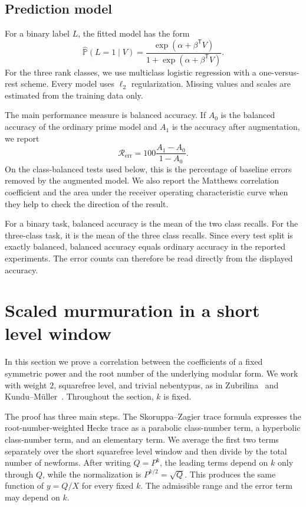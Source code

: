 \documentclass[12pt,reqno]{amsart}
\numberwithin{equation}{section}
\theoremstyle{plain}
\theoremstyle{definition}
\theoremstyle{remark}
\begin{document}
\subsection{Prediction model}

For a binary label $L$, the fitted model has the form
\begin{equation*}
\widehat{\mathbb P}(L=1\mid V)
=
\frac{\exp(\alpha+\beta^{\mathsf T}V)}
{1+\exp(\alpha+\beta^{\mathsf T}V)}.
\end{equation*}
For the three rank classes, we use multiclass logistic regression with a one-versus-rest scheme.  Every model uses $\ell_2$ regularization.
Missing values and scales are estimated from the training data only.

The main performance measure is balanced accuracy.  If $A_0$ is the balanced accuracy of the ordinary prime model and $A_1$ is the accuracy after augmentation, we report
\begin{equation}
\label{eqErrorReduction}
\mathcal R_{\mathrm{err}}
=
100\frac{A_1-A_0}{1-A_0}.
\end{equation}
On the class-balanced tests used below, this is the percentage of baseline errors removed by the augmented model.
We also report the Matthews correlation coefficient and the area under the receiver operating characteristic curve when they help to check the direction of the result.

For a binary task, balanced accuracy is the mean of the two class recalls.
For the three-class task, it is the mean of the three class recalls.
Since every test split is exactly balanced, balanced accuracy equals ordinary accuracy in the reported experiments.
The error counts can therefore be read directly from the displayed accuracy.

\section{Scaled murmuration in a short level window}
\label{sec:scaled-murmuration}

In this section we prove a correlation between the coefficients of a fixed symmetric power and the root number of the underlying modular form.
We work with weight $2$, squarefree level, and trivial nebentypus, as in Zubrilina~\cite{Zubrilina2025} and Kundu--M\"uller~\cite{KunduMuller2026}.
Throughout the section, $k$ is fixed.

The proof has three main steps.
The Skoruppa--Zagier trace formula expresses the root-number-weighted Hecke trace as a parabolic class-number term, a hyperbolic class-number term, and an elementary term.
We average the first two terms separately over the short
squarefree level window and then divide by the total number of newforms.
After writing $Q=P^k$, the leading terms depend on $k$ only through $Q$, while the normalization is
$P^{k/2}=\sqrt Q$.
This produces the same function of $y=Q/X$ for every fixed $k$.
The admissible range and the error term may depend on $k$.
\end{document}
